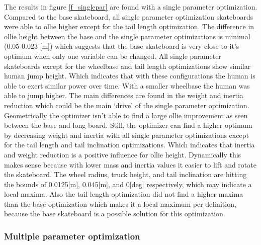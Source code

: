 \documentclass[default,iicol]{sn-jnl}
\begin{document}
{\noindent The results in figure \ref{f_singlepar} are found with a single parameter optimization. Compared to the base skateboard, all single parameter optimization skateboards were able to ollie higher except for the tail length optimization. The difference in ollie height between the base and the single parameter optimizations is minimal (0.05-0.023 [m]) which suggests that the base skateboard is very close to it's optimum when only one variable can be changed. All single parameter skateboards except for the wheelbase and tail length optimizations show similar human jump height. Which indicates that with these configurations the human is able to exert similar power over time. With a smaller wheelbase the human was able to jump higher. The main differences are found in the weight and inertia reduction which could be the main `drive' of the single parameter optimization. Geometrically the optimizer isn't able to find a large ollie improvement as seen between the base and long board. Still, the optimizer can find a higher optimum by decreasing weight and inertia with all single parameter optimizations except for the tail length and tail inclination optimizations. Which indicates that inertia and weight reduction is a positive influence for ollie height. Dynamically this makes sense because with lower mass and inertia values it easier to lift and rotate the skateboard. The wheel radius, truck height, and tail inclination are hitting the bounds of 0.0125[m], 0.045[m], and 0[deg] respectively, which may indicate a local maxima. Also the tail length optimization did not find a higher maxima than the base optimization which makes it a local maximum per definition, because the base skateboard is a possible solution for this optimization.

\subsubsection{Multiple parameter optimization}

}
\end{document}
